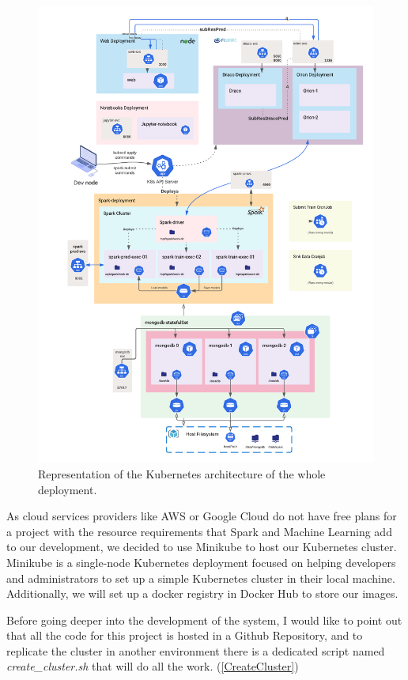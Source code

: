 \begin{figure}[H]
	\centering
	\includegraphics[width=1\linewidth]{imagenes/diagram.png}
	\caption{Representation of the Kubernetes architecture of the whole deployment.}
	\label{diagram}
\end{figure}

As cloud services providers like AWS or Google Cloud do not have free plans for a project with the resource requirements that Spark and Machine Learning add to our development,  we decided to use Minikube to host our Kubernetes cluster. Minikube is a single-node Kubernetes deployment focused on helping developers and administrators to set up a simple Kubernetes cluster in their local machine. Additionally, we will set up a docker registry in Docker Hub to store our images. 

Before going deeper into the development of the system, I would like to point out that all the code for this project is hosted in a Github Repository, and to replicate the cluster in another environment there is a dedicated script named \textit{create\_cluster.sh} that will do all the work. (\ref{CreateCluster})

